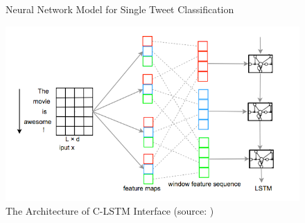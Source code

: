 \begin{figure}[]
{}
\caption{Neural Network Model for Single Tweet Classification}
\label{fig:NNModel1}
\end{figure}

  \begin{figure}
\centering
\includegraphics[width=0.8\columnwidth]{images/CNNLSTMdetail.png}
\caption{The Architecture of C-LSTM Interface (source: \cite{zhou2015c})}
\label{fig:CNNLSTMde}
\end{figure} 


